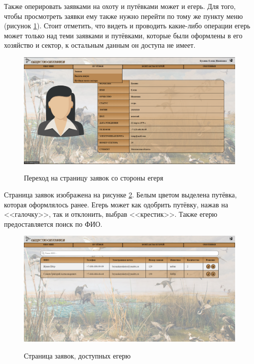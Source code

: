 	Также оперировать заявками на охоту и путёвками может и егерь. Для того, чтобы просмотреть заявки ему также нужно перейти по тому же пункту меню (рисунок \ref{fig20:image}). Стоит отметить, что видеть и проводить какие-либо операции егерь может только над теми заявками и путёвками, которые были оформлены в его хозяйство и сектор, к остальным данным он доступа не имеет.
	
	\begin{figure}[h]
		\centering
		\begin{center}
			{\includegraphics[scale=0.34]{schemes/screens/huntsman_start.png}}
			\caption{Переход на страницу заявок со стороны егеря}
			\label{fig20:image}
		\end{center}
	\end{figure}
	\newpage

	Страница заявок изображена на рисунке \ref{fig21:image}. Белым цветом выделена путёвка, которая оформлялось ранее. Егерь может как одобрить путёвку, нажав на <<галочку>>, так и отклонить, выбрав <<крестик>>. Также егерю предоставляется поиск по ФИО.

	\begin{figure}[h]
		\centering
		\begin{center}
			{\includegraphics[scale=0.321]{schemes/screens/requests_huntsman.png}}
			\caption{Страница заявок, доступных егерю}
			\label{fig21:image}
		\end{center}
	\end{figure}

